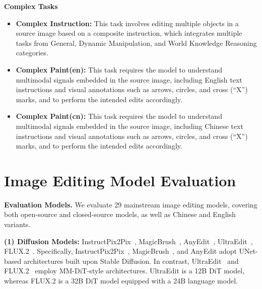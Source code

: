 \textbf{Complex Tasks}
\begin{itemize}[leftmargin=2.2em, labelsep=0.4em, itemsep=2pt]
    \item \textbf{Complex Instruction:}  This task involves editing multiple objects in a source image based on a composite instruction, which integrates multiple tasks from General, Dynamic Manipulation, and World Knowledge Reasoning categories.
    \item \textbf{Complex Paint(en):} This task requires the model to understand multimodal signals embedded in the source image, including English text instructions and visual annotations such as arrows, circles, and cross (“X”) marks, and to perform the intended edits accordingly.
    \item \textbf{Complex Paint(cn):} This task requires the model to understand multimodal signals embedded in the source image, including Chinese text instructions and visual annotations such as arrows, circles, and cross (“X”) marks, and to perform the intended edits accordingly.
\end{itemize}

\section{Image Editing Model Evaluation}
\label{supp:Evaluation Details}
\textbf{Evaluation Models.}  We evaluate 29 mainstream image editing models, covering both open-source and closed-source models, as well as Chinese and English variants.

\hspace*{1em} \noindent\textbf{(1) Diffusion Models:} InstructPix2Pix~\cite{brooks2023instructpix2pix}, MagicBrush~\cite{zhang2023magicbrush}, AnyEdit~\cite{yu2025anyedit}, UltraEdit~\cite{zhao2024ultraedit}, FLUX.2~\cite{flux-2-2025}. Specifically, InstructPix2Pix~\cite{brooks2023instructpix2pix}, MagicBrush~\cite{zhang2023magicbrush}, and AnyEdit adopt UNet-based architectures built upon Stable Diffusion. In contrast, UltraEdit~\cite{zhao2024ultraedit} and FLUX.2~\cite{flux-2-2025} employ MM-DiT-style architectures. UltraEdit is a 12B DiT model, whereas FLUX.2 is a 32B DiT model equipped with a 24B language model.

